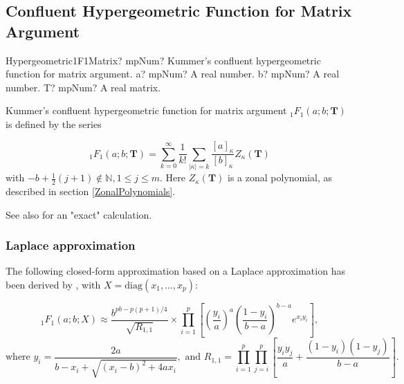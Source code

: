 \newpage
\subsection{Confluent Hypergeometric Function for Matrix Argument}
\label{Hypergeometric1F1Matrix}


\begin{mpFunctionsExtract}
	\mpFunctionThreeNotImplemented
	{Hypergeometric1F1Matrix? mpNum? Kummer's confluent hypergeometric function  for matrix argument.}
	{a? mpNum? A real number.}
	{b? mpNum? A real number.}	
	{T? mpNum? A real matrix.}	
\end{mpFunctionsExtract}


\vspace{0.3cm}
Kummer's confluent hypergeometric function  for matrix argument ${}_1F_1(a;b;\textbf{T})$ is defined by the series \citep{NIST}

\begin{equation}
	{}_1F_1(a;b;\textbf{T}) = \sum_{k=0}^\infty \frac{1}{k!}  \sum_{|\kappa|=k}  \frac{\left[a\right]_{\kappa}}{\left[b\right]_{\kappa}} Z_{\kappa}(\textbf{T})
\end{equation}
with $-b+\tfrac{1}{2}(j+1) \notin  \mathbb{N}, 1 \leq j \leq m$. Here $Z_{\kappa}(\textbf{T})$ is a zonal polynomial, as described in section \ref{ZonalPolynomials}.


See also \cite{Koev_2006} for an "exact" calculation.

\subsubsection{Laplace approximation}
The following closed-form approximation based on a Laplace approximation has been derived by \cite{Butler_Wood_2002}, with $X=\text{diag}(x_1,\ldots,x_p)$:

\begin{equation}
	{}_1{F}_1(a;b;X)  \approx \frac{b^{pb-p(p+1)/4}}{\sqrt{R_{1,1}}}  \times \prod_{i=1}^p \left[\left(\frac{y_i}{a}\right)^a \left(\frac{1-y_i}{b-a} \right)^{b-a} e^{x_i y_i}  \right],
\end{equation}
\begin{equation*}
	\text{where } y_i=\frac{2a}{b-x_i+\sqrt{(x_i-b)^2 + 4ax_i}}, \text{ and } R_{1,1} = \prod_{i=1}^p  \prod_{j=i}^p \left[\frac{y_i y_j}{a}+\frac{(1-y_i)(1-y_j)}{b-a}\right]. 
\end{equation*}












